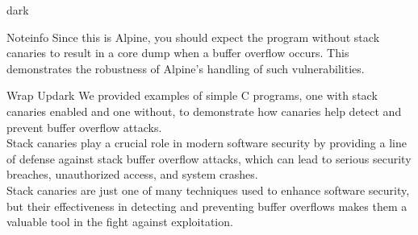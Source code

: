 \begin{baseBoxThree}{}{dark}
    \smallskip
    \begin{baseBoxThree}{Note}{info}
        \smallskip
            Since this is Alpine, you should expect the program without stack canaries to result in a core dump when a buffer overflow occurs.
            This demonstrates the robustness of Alpine's handling of such vulnerabilities.
        \smallskip
    \end{baseBoxThree}
    \smallskip
    \begin{baseBoxThree}{Wrap Up}{dark}
        \smallskip
        We provided examples of simple C programs, one with stack canaries enabled and one without, to demonstrate how canaries help detect and prevent buffer overflow attacks.
        \\
        
        Stack canaries play a crucial role in modern software security by providing a line of defense against stack buffer overflow attacks, which can lead to serious security breaches, unauthorized access, and system crashes.
        \\

        Stack canaries are just one of many techniques used to enhance software security, but their effectiveness in detecting and preventing buffer overflows makes them a valuable tool in the fight against exploitation.
        \smallskip
    \end{baseBoxThree}
    \smallskip
\end{baseBoxThree}
